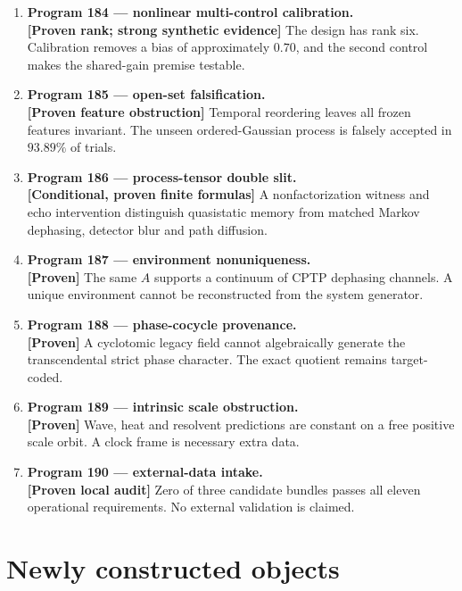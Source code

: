 \documentclass[11pt,a4paper,openany]{report}
\newcommand{\statusProven}{\textcolor{fingreen}{[Proven]}}
\begin{document}
\begin{enumerate}
\item 
\textbf{Program 184 --- nonlinear multi-control calibration.}\\
\textbf{[Proven rank; strong synthetic evidence]} The design has rank six. Calibration removes a bias of approximately \(0.70\), and the second control makes the shared-gain premise testable.

\item 
\textbf{Program 185 --- open-set falsification.}\\
\textbf{[Proven feature obstruction]} Temporal reordering leaves all frozen features invariant. The unseen ordered-Gaussian process is falsely accepted in \(93.89\%\) of trials.

\item 
\textbf{Program 186 --- process-tensor double slit.}\\
\textbf{[Conditional, proven finite formulas]} A nonfactorization witness and echo intervention distinguish quasistatic memory from matched Markov dephasing, detector blur and path diffusion.

\item 
\textbf{Program 187 --- environment nonuniqueness.}\\
\textbf{\statusProven{}} The same \(A\) supports a continuum of CPTP dephasing channels. A unique environment cannot be reconstructed from the system generator.

\item 
\textbf{Program 188 --- phase-cocycle provenance.}\\
\textbf{\statusProven{}} A cyclotomic legacy field cannot algebraically generate the transcendental strict phase character. The exact quotient remains target-coded.

\item 
\textbf{Program 189 --- intrinsic scale obstruction.}\\
\textbf{\statusProven{}} Wave, heat and resolvent predictions are constant on a free positive scale orbit. A clock frame is necessary extra data.

\item 
\textbf{Program 190 --- external-data intake.}\\
\textbf{[Proven local audit]} Zero of three candidate bundles passes all eleven operational requirements. No external validation is claimed.

\end{enumerate}

\section{Newly constructed objects}
\end{document}
